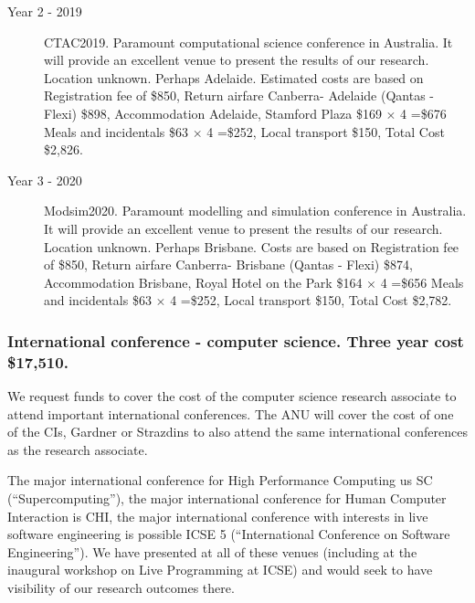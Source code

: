 \documentclass[a4paper,twoside,12pt,compact]{article}
\begin{document}
\begin{description}




\item[Year 2 - 2019] CTAC2019.
Paramount computational science conference in Australia. It will provide an excellent venue to present the results of our research. Location unknown. Perhaps Adelaide.
Estimated costs are based on 
Registration fee of \$850, 
Return airfare Canberra- Adelaide (Qantas - Flexi) \$898,
Accommodation Adelaide, Stamford Plaza \$169 $\times$ 4 =\$676
Meals and incidentals \$63 $\times$ 4 =\$252, Local transport \$150, 
Total Cost \$2,826.




\item[Year 3 - 2020] Modsim2020.
Paramount modelling and simulation conference in Australia. It will provide an excellent venue to present the results of our research. Location unknown. Perhaps Brisbane.
Costs are based on 
Registration fee of \$850, 
Return airfare Canberra- Brisbane (Qantas - Flexi) \$874,
Accommodation Brisbane, Royal Hotel on the Park \$164 $\times$ 4 =\$656
Meals and incidentals \$63 $\times$ 4 =\$252, Local transport \$150, 
Total Cost \$2,782.




\end{description}

\subsubsection*{International conference - computer science. Three year cost \$17,510.}


We request funds to cover the cost of the computer science research associate to attend important international conferences.    
The ANU will cover the cost of one of the CIs, Gardner or Strazdins to also attend the same international conferences as the research associate. 

The major international conference for High Performance Computing us SC (``Supercomputing''), the major international conference for Human Computer Interaction is CHI, the major international conference with interests in live software engineering is possible ICSE 5 (``International Conference on Software Engineering''). We have presented at all of these venues (including at the inaugural workshop on Live Programming at ICSE) and would seek to have visibility of our research outcomes there. 
\end{document}
